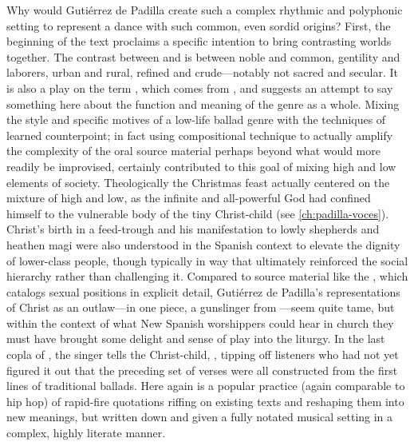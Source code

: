 Why would Gutiérrez de Padilla create such a complex rhythmic and polyphonic
setting to represent a dance with such common, even sordid origins?
First, the beginning of the text proclaims a specific intention to bring
contrasting worlds together.
The contrast between  and  is between noble and common,
gentility and laborers, urban and rural, refined and crude---notably not sacred
and secular.
It is also a play on the term , which comes from ,
and suggests an attempt to say something here about the function and meaning of
the genre as a whole.
Mixing the style and specific motives of a low-life ballad genre with the
techniques of learned counterpoint; in fact using compositional technique to
actually amplify the complexity of the oral source material perhaps
beyond what would more readily be improvised, certainly contributed to this
goal of mixing high and low elements of society.
Theologically the Christmas feast actually centered on the mixture of high and
low, as the infinite and all-powerful God had confined himself to the
vulnerable body of the tiny Christ-child (see \cref{ch:padilla-voces}).
Christ's birth in a feed-trough and his manifestation to lowly shepherds and
heathen magi were also understood in the Spanish context to elevate the dignity
of lower-class people, though typically in way that ultimately reinforced the
social hierarchy rather than challenging it.%
    \citXXX[al establo]
Compared to source material like the , which
catalogs sexual positions in explicit detail, Gutiérrez de Padilla's
representations of Christ as an outlaw---in one piece, a gunslinger from
---seem quite tame, but within the context of what New
Spanish worshippers could hear in church they must have brought some delight
and sense of play into the liturgy.%
In the last copla of , the singer tells the
Christ-child, , tipping off listeners who had not yet figured it out that the
preceding set of \XXX[no.] verses were all constructed from the first lines of
traditional  ballads.
Here again is a popular practice (again comparable to hip hop) of rapid-fire
quotations riffing on existing texts and reshaping them into new meanings, but
written down and given a fully notated musical setting in a complex, highly
literate manner.

